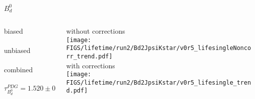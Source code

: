 %   
%   
%




\begin{frame}{$B_d^0$}
  
  \begin{columns}
  
  \begin{column}{0.45\textwidth}
  {\color{scqorange}biased} \\[2mm]
  \resizebox{\textwidth}{!}{}\\[5mm]
  {\color{scqred}unbiased} \\[2mm]
  \resizebox{\textwidth}{!}{}\\[5mm]
  {\color{scqgreen}combined} \\[2mm]
  \resizebox{\textwidth}{!}{}\\
  \begin{equation*}
    \tau_{B_d^0}^{PDG} = 1.520 \pm 0.004
  \end{equation*}
  \end{column}

  \begin{column}{0.45\textwidth}
  \footnotesize
  {without corrections} \\[2mm]
  \texttt{[image: \\FIGS/lifetime/run2/Bd2JpsiKstar/v0r5\_lifesingleNoncorr\_trend.pdf]}\\[3mm]
  {with corrections} \\[2mm]
  \texttt{[image: \\FIGS/lifetime/run2/Bd2JpsiKstar/v0r5\_lifesingle\_trend.pdf]}
  \end{column}
  
  \end{columns}

\end{frame}



